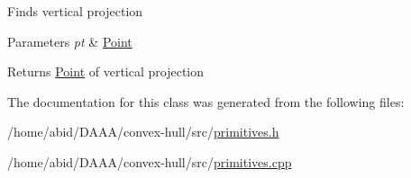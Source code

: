 Finds vertical projection 
\begin{DoxyParams}{Parameters}
{\em pt} & \mbox{\hyperlink{class_point}{Point}} \\
\hline
\end{DoxyParams}
\begin{DoxyReturn}{Returns}
\mbox{\hyperlink{class_point}{Point}} of vertical projection 
\end{DoxyReturn}


The documentation for this class was generated from the following files\+:\begin{DoxyCompactItemize}
\item 
/home/abid/\+D\+A\+A\+A/convex-\/hull/src/\mbox{\hyperlink{primitives_8h}{primitives.\+h}}\item 
/home/abid/\+D\+A\+A\+A/convex-\/hull/src/\mbox{\hyperlink{primitives_8cpp}{primitives.\+cpp}}\end{DoxyCompactItemize}
